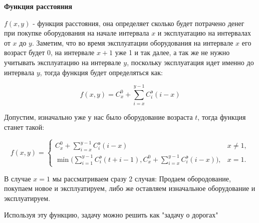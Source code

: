 \bigskip

\textbf{Функция расстояния}

$f(x,y)$ - функция расстояния, она определяет сколько будет потрачено денег при покупке оборудования на начале интервала $x$ и эксплуатацию на интервалах от $x$ до $y$. Заметим, что во время эксплуатации оборудования на интервале $x$ его возраст будет 0, на интервале $x+1$ уже 1 и так далее, а так же не нужно учитывать эксплуатацию на интервале $y$, поскольку эксплуатация идет именно до интервала $y$, тогда функция будет определяться как: 

\[
\boxed{ f(x,y) = C_x^0 + \sum_{i=x}^{y-1} C_i^\text{э} (i-x) }
\]

Допустим, изначально уже у нас было оборудование возраста $t$, тогда функция станет такой:

\[
\boxed{ f(x,y) = \begin{cases}
		C_x^0 + \sum\limits_{i=x}^{y-1} C_i^\text{э} (i-x) & x \neq 1, \\
		\min\Big(\sum\limits_{i=1}^{y-1} C_i^\text{э} (t + i- 1), C_x^0 + \sum\limits_{i=x}^{y-1} C_i^\text{э} (i-x)\Big), & x = 1.
	\end{cases} }
\]

В случае $x = 1$ мы рассматриваем сразу 2 случая: Продаем обородование, покупаем новое и эксплуатируем, либо же оставляем изначальное оборудование и эксплуатируем.

Используя эту функцию, задачу можно решить как "задачу о дорогах"

\bigskip